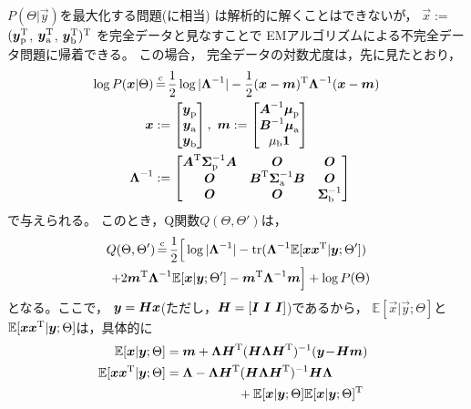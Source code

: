 $P(\Theta|\Vec{y})$を最大化する問題(に相当)
は解析的に解くことはできないが，
$\Vec{x}:=$
$(\Vec{y}_{\rm p}^{\rm T}$,
$\Vec{y}_{\rm a}^{\rm T}$,
$\Vec{y}_{\rm b}^{\rm T})^{\rm T}$
を完全データと見なすことで
EMアルゴリズムによる不完全データ問題に帰着できる。
この場合，
完全データの対数尤度は，先に見たとおり，
\begin{align}
\log
P(\Vec{x}|{\Theta})
&\mathop{=}^{\rm c}
\frac{1}{2}\log |\Mat{\Lambda}^{-1}|
-\frac{1}{2}
(\Vec{x}-\Vec{m})^{\rm T}
\Mat{\Lambda}^{-1}
(\Vec{x}-\Vec{m})
\nonumber\\
\Vec{x}&:=
\begin{bmatrix}
\Vec{y}_{\rm p}\\
\Vec{y}_{\rm a}\\
\Vec{y}_{\rm b}
\end{bmatrix},~
\Vec{m}:=
\begin{bmatrix}
\Mat{A}^{-1}\Vec{\mu}_{\rm p}\\
\Mat{B}^{-1}\Vec{\mu}_{\rm a}\\
\mu_{\rm b}\Vec{1}
\end{bmatrix}\\
\Mat{\Lambda}^{-1}&:=
\begin{bmatrix}
\Mat{A}^{\rm T}
\Mat{\Sigma}_{\rm p}^{-1}
\Mat{A}
&\Vec{O}&\Vec{O}\\
\Vec{O}&\Mat{B}^{\rm T}
\Mat{\Sigma}_{\rm a}^{-1}
\Mat{B}&\Vec{O}\\
\Vec{O}&\Vec{O}&\Vec{\Sigma}_{\rm b}^{-1}
\end{bmatrix}
\end{align}
で与えられる。
このとき，Q関数$Q({\Theta},{\Theta}')$は，
\begin{multline}
Q({\Theta},{\Theta}')
\mathop{=}^{\rm c}
\frac{1}{2}
\Big[
\log |\Mat{\Lambda}^{-1}|
-
\mbox{tr}
(
\Mat{\Lambda}^{-1}\mathbb{E}[\Vec{x}\Vec{x}^{\rm T}|\Vec{y};\Theta']
)
\\
+2\Vec{m}^{\rm T}\Mat{\Lambda}^{-1}\mathbb{E}[\Vec{x}|\Vec{y};\Theta']
-\Vec{m}^{\rm T}\Mat{\Lambda}^{-1}\Vec{m}
\Big]
+\log P(\Theta)
\!\!\!\!
\end{multline}
となる。ここで，
$\Vec{y}=\Mat{H}\Vec{x}$(ただし，$\Mat{H}=[\Mat{I}~\Mat{I}~\Mat{I}]$)であるから，
$\mathbb{E}[\Vec{x}|\Vec{y};\Theta]$と
$\mathbb{E}[\Vec{x}\Vec{x}^{\rm T}|\Vec{y};\Theta]$は，具体的に
\begin{align}
\hspace{-0.2cm}
\mathbb{E}[\Vec{x}|\Vec{y};\Theta]&=
\Vec{m}+\Mat{\Lambda}\Mat{H}^{\rm T}
(\Mat{H}\Mat{\Lambda}\Mat{H}^{\rm T})^{-1}
(\Vec{y}\!-\!\Mat{H}\Vec{m})
\!\!\
\label{eq:estep_mean}
\\
\hspace{-0.2cm}
\mathbb{E}[\Vec{x}\Vec{x}^{\rm T}|\Vec{y};\Theta]
&=
\Mat{\Lambda}-
\Mat{\Lambda}\Mat{H}^{\rm T}(\Mat{H}\Mat{\Lambda}\Mat{H}^{\rm T})^{-1}
\Mat{H}\Mat{\Lambda}
\nonumber\\
&~~~~~~~~~~~~~~~~~+
\mathbb{E}[\Vec{x}|\Vec{y};\Theta]
\mathbb{E}[\Vec{x}|\Vec{y};\Theta]^{\rm T}
\label{eq:estep_var}
\end{align}

